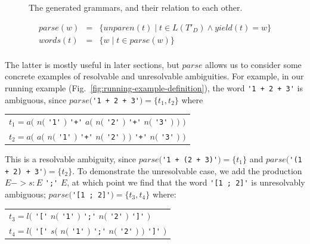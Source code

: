 \documentclass[runningheads]{llncs}
\newcommand{\yield}{\mathit{yield}} %
\newcommand{\semantic}{\mathit{unparen}} %
\newcommand{\parse}{\mathit{parse}} %
\newcommand{\words}{\mathit{words}} %
\begin{document}
\begin{figure}
  \caption{The generated grammars, and their relation to each other.}
  \label{fig:grammar-square}
\end{figure}

$$
\begin{array}{rcl}
\parse(w) & = & \{ \semantic(t) \mid t \in L(T'_D) \land \yield(t) = w \} \\
\words(t) & = & \{ w \mid t \in \parse(w) \} \\
\end{array}
$$

\noindent The latter is mostly useful in later sections, but $\parse$ allows us to consider some concrete examples of resolvable and unresolvable ambiguities. For example, in our running example (Fig.~\ref{fig:running-example-definition}), the word \verb|'1 + 2 + 3'| is ambiguous, since $\parse($\verb|'1 + 2 + 3'|$) = \{t_1, t_2\}$ where

\begin{center}
  \begin{tabular}{l}
    $t_1 = a($ \hphantom{$a($} $n($ \verb|'1'| $)$ \verb|'+'| $a($ $n($ \verb|'2'| $)$ \hphantom{$)$} \verb|'+'| $n($ \verb|'3'| $)$ $)$ $)$ \\
    $t_2 = a($ $a($ $n($ \verb|'1'| $)$ \verb|'+'| \hphantom{$a($} $n($ \verb|'2'| $)$ $)$ \verb|'+'| $n($ \verb|'3'| $)$ \hphantom{$)$} $)$ \\
  \end{tabular}
\end{center}

\noindent This is a resolvable ambiguity, since $\parse($\verb|'1 + (2 + 3)'|$) = \{t_1\}$ and $\parse($\verb|'(1 + 2) + 3'|$) = \{t_2\}$. To demonstrate the unresolvable case, we add the production $E -> s: E$ \verb|';'| $E$, at which point we find that the word \verb|'[1 ; 2]'| is unresolvably ambiguous; $\parse($\verb|'[1 ; 2]'|$) = \{t_3, t_4\}$ where:

\begin{center}
  \begin{tabular}{l}
    $t_3 = l($ \verb|'['| \hphantom{$s($} $n($ \verb|'1'| $)$ \verb|';'| $n($ \verb|'2'| $)$ \hphantom{$)$} \verb|']'| $)$ \\
    $t_4 = l($ \verb|'['| $s($ $n($ \verb|'1'| $)$ \verb|';'| $n($ \verb|'2'| $)$ $)$ \verb|']'| $)$ \\
  \end{tabular}
\end{center}
\end{document}
